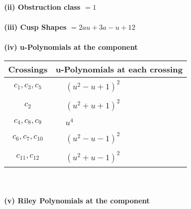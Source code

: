 \documentclass[1p]{elsarticle_modified}
\theoremstyle{definition}
\begin{document}
\flushleft \textbf{(ii) Obstruction class $= 1$}\\~\\
\flushleft \textbf{(iii) Cusp Shapes $= 2 a u+3 a- u+12$}\\~\\
\newpage\renewcommand{\arraystretch}{1}
\flushleft \textbf{(iv) u-Polynomials at the component}\newline \\
\begin{tabular}{m{50pt}|m{274pt}}
Crossings & \hspace{64pt}u-Polynomials at each crossing \\
\hline $$\begin{aligned}c_{1},c_{3},c_{5}\end{aligned}$$&$\begin{aligned}
&(u^2- u+1)^2
\end{aligned}$\\
\hline $$\begin{aligned}c_{2}\end{aligned}$$&$\begin{aligned}
&(u^2+u+1)^2
\end{aligned}$\\
\hline $$\begin{aligned}c_{4},c_{8},c_{9}\end{aligned}$$&$\begin{aligned}
&u^4
\end{aligned}$\\
\hline $$\begin{aligned}c_{6},c_{7},c_{10}\end{aligned}$$&$\begin{aligned}
&(u^2- u-1)^2
\end{aligned}$\\
\hline $$\begin{aligned}c_{11},c_{12}\end{aligned}$$&$\begin{aligned}
&(u^2+u-1)^2
\end{aligned}$\\
\hline
\end{tabular}\\~\\
\newpage\renewcommand{\arraystretch}{1}
\flushleft \textbf{(v) Riley Polynomials at the component}\newline \\
\end{document}
